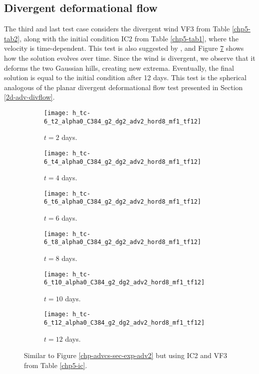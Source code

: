 \subsection{Divergent deformational flow}
The third and last test case considers the divergent wind VF3 from Table \ref{chp5-tab2}, along with the initial condition IC2 from Table \ref{chp5-tab1}, 
where the velocity is time-dependent.
This test is also suggested by \citet{nair:2010}, and Figure \ref{chp-advcs-sec-exp-adv4} shows how the solution evolves over time.
Since the wind is divergent, we observe that it deforms the two Gaussian hills, creating new extrema.
Eventually, the final solution is equal to the initial condition after 12 days.
This test is the spherical analogous of the planar divergent deformational flow test presented in Section \ref{2d-adv-divflow}.
\begin{figure}[!htb]
	\centering
	\begin{subfigure}{0.45\textwidth}
		\centering
		\texttt{[image: h\_tc-6\_t2\_alpha0\_C384\_g2\_dg2\_adv2\_hord8\_mf1\_tf12]}
		\caption{$t=2$ days.\label{chp-advcs-sec-exp-adv4-a}}
	\end{subfigure}
	\begin{subfigure}{0.45\textwidth}
		\centering
		\texttt{[image: h\_tc-6\_t4\_alpha0\_C384\_g2\_dg2\_adv2\_hord8\_mf1\_tf12]}
		\caption{$t=4$ days.\label{chp-advcs-sec-exp-adv4-b}}
	\end{subfigure}

	\begin{subfigure}{0.45\textwidth}
		\centering
		\texttt{[image: h\_tc-6\_t6\_alpha0\_C384\_g2\_dg2\_adv2\_hord8\_mf1\_tf12]}
		\caption{$t=6$ days.\label{chp-advcs-sec-exp-adv4-c}}
	\end{subfigure}
	\begin{subfigure}{0.45\textwidth}
		\centering
		\texttt{[image: h\_tc-6\_t8\_alpha0\_C384\_g2\_dg2\_adv2\_hord8\_mf1\_tf12]}
		\caption{$t=8$ days.\label{chp-advcs-sec-exp-adv4-d}}
	\end{subfigure}

	\begin{subfigure}{0.45\textwidth}
		\centering
		\texttt{[image: h\_tc-6\_t10\_alpha0\_C384\_g2\_dg2\_adv2\_hord8\_mf1\_tf12]}
		\caption{$t=10$ days.\label{chp-advcs-sec-exp-adv4-e}}
	\end{subfigure}
	\begin{subfigure}{0.45\textwidth}
		\centering
		\texttt{[image: h\_tc-6\_t12\_alpha0\_C384\_g2\_dg2\_adv2\_hord8\_mf1\_tf12]}
		\caption{$t=12$ days.\label{chp-advcs-sec-exp-adv4-f}}
	\end{subfigure}
	\caption{Similar to Figure \ref{chp-advcs-sec-exp-adv2} but using IC2 and VF3 from Table \ref{chp5-ic}.\label{chp-advcs-sec-exp-adv4}}
\end{figure}

